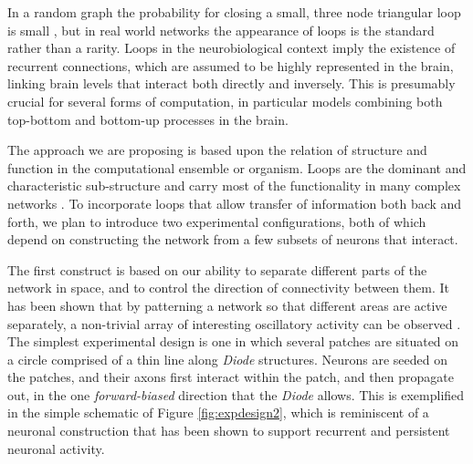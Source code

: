 In a random graph the probability for closing a small, three node triangular loop is small \cite{Vazquez2004}, but in real world networks \cite{Eckmann2002} the appearance of loops is the standard rather than a rarity. Loops in the neurobiological context imply the existence of recurrent connections, which are assumed to be highly represented in the brain, linking brain levels that interact both directly and inversely. This is presumably crucial for several forms of computation, in particular models combining both top-bottom and bottom-up processes in the brain. 

The approach we are proposing is based upon the relation of structure and function in the computational ensemble or organism. Loops are the dominant and characteristic sub-structure and carry most of the functionality in many complex networks \cite{Eckmann2004}. To incorporate loops that allow transfer of information both back and forth, we plan to introduce two experimental configurations, both of which depend on constructing the network from a few subsets of neurons that interact.

The first construct is based on our ability to separate different parts of the network in space, and to control the direction of connectivity between them.  It has been shown that by patterning a network so that different areas are active separately, a non-trivial array of interesting oscillatory activity can be observed \cite{SheinIdelson2010}. The simplest experimental design is one in which several patches are situated on a circle comprised of a thin line along {\it Diode} structures. Neurons are seeded on the patches, and their axons first interact within the patch, and then propagate out, in the one {\it forward-biased} direction that the {\it Diode} allows. This is exemplified in the simple schematic of Figure \ref{fig:expdesign2}, which is reminiscent of a neuronal construction \cite{Vishwanathan2011} that has been shown to support recurrent and persistent neuronal activity.

